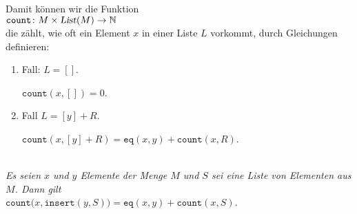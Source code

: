 \noindent
Damit k\"onnen wir die Funktion \\[0.1cm]
\hspace*{1.3cm} $\texttt{count}\colon M \times \textsl{List}(M) \rightarrow \mathbb{N}$ \\[0.1cm]
die z\"ahlt, wie oft ein Element $x$ in einer Liste $L$ vorkommt, durch Gleichungen definieren:
\begin{enumerate}
\item Fall: $L = []$.

      $\mathtt{count}(x,[]) = 0$.
\item Fall $L = [y] + R$.  

      $\mathtt{count}(x,[y] + R) = \mathtt{eq}(x,y) + \mathtt{count}(x, R)$.
\end{enumerate}

\begin{Lemma}\hspace*{\fill}\\
{\em
  Es seien $x$ und $y$ Elemente der Menge $M$ und $S$ sei eine Liste von Elementen aus $M$. Dann gilt \\[0.1cm]
  \hspace*{1.3cm} 
  $\mathtt{count}\bigl(x, \mathtt{insert}(y, S) \bigr) = \mathtt{eq}(x,y) + \mathtt{count}(x,S)$.
}  
\end{Lemma}

